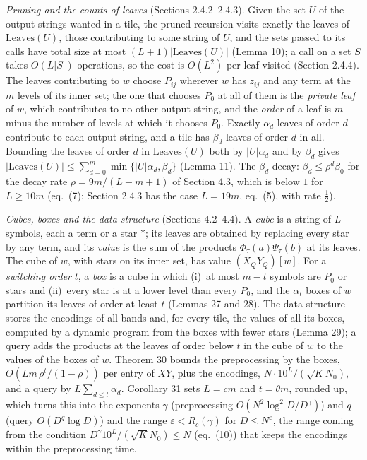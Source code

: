 \documentclass[11pt]{article}
\theoremstyle{definition}
\theoremstyle{remark}
\newcommand{\Leaves}{\mathrm{Leaves}}
\newcommand{\Nz}{N_0}
\begin{document}
\emph{Pruning and the counts of leaves} (Sections 2.4.2--2.4.3). Given the set $U$ of the output strings wanted in a tile, the pruned recursion visits exactly the leaves of $\Leaves(U)$, those contributing to some string of $U$, and the sets passed to its calls have total size at most $(L+1)|\Leaves(U)|$ (Lemma 10); a call on a set $S$ takes $O(L|S|)$ operations, so the cost is $O(L^2)$ per leaf visited (Section 2.4.4). The leaves contributing to $w$ choose $P_{ij}$ wherever $w$ has $z_{ij}$ and any term at the $m$ levels of its inner set; the one that chooses $P_0$ at all of them is the \emph{private leaf} of $w$, which contributes to no other output string, and the \emph{order} of a leaf is $m$ minus the number of levels at which it chooses $P_0$. Exactly $\alpha_d$ leaves of order $d$ contribute to each output string, and a tile has $\beta_d$ leaves of order $d$ in all. Bounding the leaves of order $d$ in $\Leaves(U)$ both by $|U|\alpha_d$ and by $\beta_d$ gives $|\Leaves(U)|\le\sum_{d=0}^m\min\{|U|\alpha_d,\beta_d\}$ (Lemma 11). The $\beta_d$ decay: $\beta_d\le\rho^d\beta_0$ for the decay rate $\rho=9m/(L-m+1)$ of Section 4.3, which is below $1$ for $L\ge10m$ (eq.~(7); Section 2.4.3 has the case $L=19m$, eq.~(5), with rate $\frac12$).

\emph{Cubes, boxes and the data structure} (Sections 4.2--4.4). A \emph{cube} is a string of $L$ symbols, each a term or a star $\ast$; its leaves are obtained by replacing every star by any term, and its \emph{value} is the sum of the products $\Phi_\tau(a)\Psi_\tau(b)$ at its leaves. The cube of $w$, with stars on its inner set, has value $(X_QY_Q)[w]$. For a \emph{switching order} $t$, a \emph{box} is a cube in which (i)~at most $m-t$ symbols are $P_0$ or stars and (ii)~every star is at a lower level than every $P_0$, and the $\alpha_t$ boxes of $w$ partition its leaves of order at least $t$ (Lemmas 27 and 28). The data structure stores the encodings of all bands and, for every tile, the values of all its boxes, computed by a dynamic program from the boxes with fewer stars (Lemma 29); a query adds the products at the leaves of order below $t$ in the cube of $w$ to the values of the boxes of $w$. Theorem 30 bounds the preprocessing by the boxes, $O(Lm\,\rho^t/(1-\rho))$ per entry of $XY$, plus the encodings, $N\cdot10^L/(\sqrt K\Nz)$, and a query by $L\sum_{d\le t}\alpha_d$. Corollary 31 sets $L=cm$ and $t=\theta m$, rounded up, which turns this into the exponents $\gamma$ (preprocessing $O(N^2\log^2D/D^\gamma)$) and $q$ (query $O(D^q\log D)$) and the range $\varepsilon<R_c(\gamma)$ for $D\le N^\varepsilon$, the range coming from the condition $D^\gamma10^L/(\sqrt K\Nz)\le N$ (eq.~(10)) that keeps the encodings within the preprocessing time.
\end{document}
